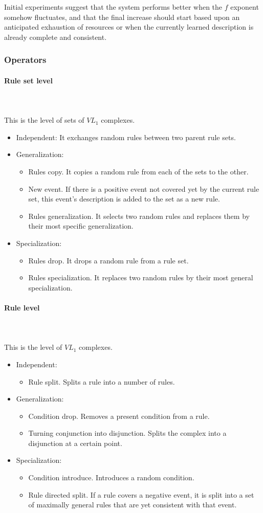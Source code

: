 \documentclass[12pt]{article}
\newcommand{\myparagraph}[1]{\paragraph{#1}\mbox{}\\\\}
\begin{document}
Initial experiments suggest that the system performs better when the $f$ exponent somehow fluctuates, and that the final increase should start based upon an anticipated exhaustion of resources or when the currently learned description is already complete and consistent.

\subsubsection{Operators}
\myparagraph{Rule set level}
This is the level of sets of $VL_1$ complexes.
\begin{itemize}
\item Independent: It exchanges random rules between two parent rule sets.
\item Generalization:
\begin{itemize}
\item Rules copy. It copies a random rule from each of the sets to the other.
\item New event. If there is a positive event not covered yet by the current rule set, this event's description is added to the set as a new rule.
\item Rules generalization. It selects two random rules and replaces them by their most specific generalization.
\end{itemize}
\item Specialization:
\begin{itemize}
\item Rules drop. It drops a random rule from a rule set.
\item Rules specialization. It replaces two random rules by their most general specialization.
\end{itemize}
\end{itemize}

\myparagraph{Rule level}
This is the level of $VL_1$ complexes.
\begin{itemize}
\item Independent:
\begin{itemize}
\item Rule split. Splits a rule into a number of rules.
\end{itemize}
\item Generalization:
\begin{itemize}
\item Condition drop. Removes a present condition from a rule.
\item Turning conjunction into disjunction. Splits the complex into a disjunction at a certain point.
\end{itemize}
\item Specialization:
\begin{itemize}
\item Condition introduce. Introduces a random condition.
\item Rule directed split. If a rule covers a negative event, it is split into a set of maximally general rules that are yet consistent with that event.
\end{itemize}
\end{itemize}
\end{document}
